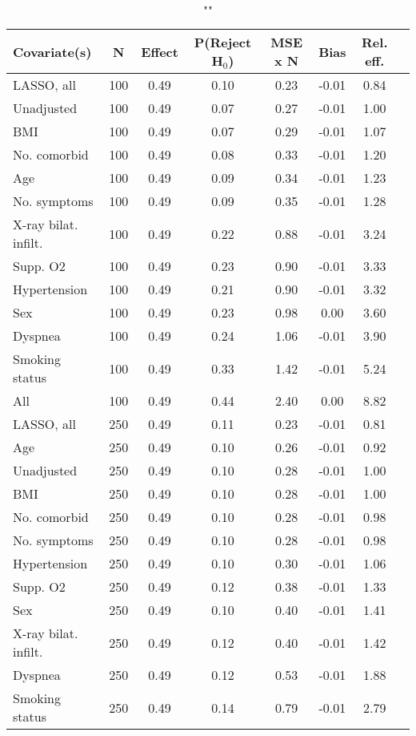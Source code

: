 \documentclass{article}
\begin{document}
{\tabcolsep=6pt  %
\begin{longtable}{lccccccc}
\caption{""} \\
Covariate(s) & N & Effect & P(Reject H$_0$) & MSE x N & Bias & Rel. eff.\\ \midrule
LASSO, all & 100 & 0.49 & 0.10 & 0.23 & -0.01 & 0.84 \\ 
Unadjusted & 100 & 0.49 & 0.07 & 0.27 & -0.01 & 1.00 \\ 
BMI & 100 & 0.49 & 0.07 & 0.29 & -0.01 & 1.07 \\ 
No. comorbid & 100 & 0.49 & 0.08 & 0.33 & -0.01 & 1.20 \\ 
Age & 100 & 0.49 & 0.09 & 0.34 & -0.01 & 1.23 \\ 
No. symptoms & 100 & 0.49 & 0.09 & 0.35 & -0.01 & 1.28 \\ 
X-ray bilat. infilt. & 100 & 0.49 & 0.22 & 0.88 & -0.01 & 3.24 \\ 
Supp. O2 & 100 & 0.49 & 0.23 & 0.90 & -0.01 & 3.33 \\ 
Hypertension & 100 & 0.49 & 0.21 & 0.90 & -0.01 & 3.32 \\ 
Sex & 100 & 0.49 & 0.23 & 0.98 &  0.00 & 3.60 \\ 
Dyspnea & 100 & 0.49 & 0.24 & 1.06 & -0.01 & 3.90 \\ 
Smoking status & 100 & 0.49 & 0.33 & 1.42 & -0.01 & 5.24 \\ 
All & 100 & 0.49 & 0.44 & 2.40 &  0.00 & 8.82 \\ \midrule 
LASSO, all & 250 & 0.49 & 0.11 & 0.23 & -0.01 & 0.81 \\ 
Age & 250 & 0.49 & 0.10 & 0.26 & -0.01 & 0.92 \\ 
Unadjusted & 250 & 0.49 & 0.10 & 0.28 & -0.01 & 1.00 \\ 
BMI & 250 & 0.49 & 0.10 & 0.28 & -0.01 & 1.00 \\ 
No. comorbid & 250 & 0.49 & 0.10 & 0.28 & -0.01 & 0.98 \\ 
No. symptoms & 250 & 0.49 & 0.10 & 0.28 & -0.01 & 0.98 \\ 
Hypertension & 250 & 0.49 & 0.10 & 0.30 & -0.01 & 1.06 \\ 
Supp. O2 & 250 & 0.49 & 0.12 & 0.38 & -0.01 & 1.33 \\ 
Sex & 250 & 0.49 & 0.10 & 0.40 & -0.01 & 1.41 \\ 
X-ray bilat. infilt. & 250 & 0.49 & 0.12 & 0.40 & -0.01 & 1.42 \\ 
Dyspnea & 250 & 0.49 & 0.12 & 0.53 & -0.01 & 1.88 \\ 
Smoking status & 250 & 0.49 & 0.14 & 0.79 & -0.01 & 2.79 \\ 

\end{longtable}}
\end{document}
